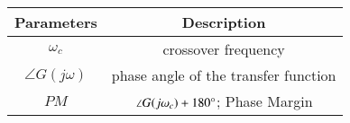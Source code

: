 \begin{tabular}{|c|c|}
\hline
\textbf{Parameters} & \textbf{Description} \\
\hline
$\omega_c$ & crossover frequency \\
\hline
$\angle G(j\omega)$ & phase angle of the transfer function \\
\hline
$PM$ & $\angle G(j\omega_c)+180\degree$; Phase Margin\\
\hline
\end{tabular}
